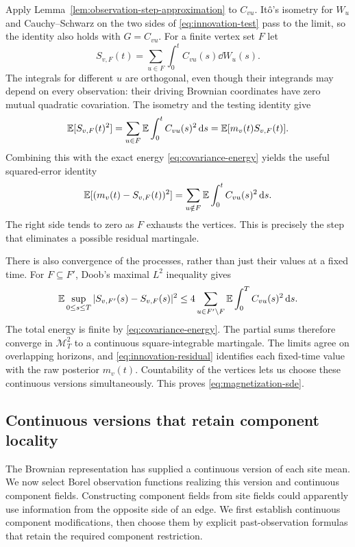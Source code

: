 Apply Lemma~\ref{lem:observation-step-approximation} to $C_{vu}$.
It\^o's isometry for $W_u$ and Cauchy--Schwarz on the two sides of
\eqref{eq:innovation-test} pass to the limit, so the identity also
holds with $G=C_{vu}$.  For a finite vertex set $F$ let
\[
 S_{v,F}(t)=\sum_{u\in F}\int_0^tC_{vu}(s)\dd W_u(s).
\]
The integrals for different $u$ are orthogonal, even though their
integrands may depend on every observation: their driving Brownian
coordinates have zero mutual quadratic covariation.  The isometry and
the testing identity give
\[
 \mathbb E[S_{v,F}(t)^2]
   =\sum_{u\in F}\mathbb E\int_0^t C_{vu}(s)^2\,\mathrm d s
   =\mathbb E[m_v(t)S_{v,F}(t)] .
\]
Combining this with the exact energy
\eqref{eq:covariance-energy} yields the useful squared-error identity
\begin{equation}
 \label{eq:innovation-residual}
 \mathbb E[(m_v(t)-S_{v,F}(t))^2]
     =\sum_{u\notin F}\mathbb E\int_0^t C_{vu}(s)^2\,\mathrm d s.
\end{equation}
The right side tends to zero as $F$ exhausts the vertices.  This is
precisely the step that eliminates a possible residual martingale.

There is also convergence of the processes, rather than just their
values at a fixed time.  For $F\subseteq F'$, Doob's maximal
$L^2$ inequality gives
\[
 \mathbb E\sup_{0\le s\le T}|S_{v,F'}(s)-S_{v,F}(s)|^2
 \le4\sum_{u\in F'\setminus F}
                    \mathbb E\int_0^T C_{vu}(s)^2\,\mathrm d s .
\]
The total energy is finite by \eqref{eq:covariance-energy}.  The
partial sums therefore converge in $\mathcal M_T^2$ to a continuous
square-integrable martingale.  The limits agree on overlapping
horizons, and \eqref{eq:innovation-residual} identifies each
fixed-time value with the raw posterior $m_v(t)$.  Countability of
the vertices lets us choose these continuous versions simultaneously.
This proves \eqref{eq:magnetization-sde}.

\subsection{Continuous versions that retain component locality}
 \label{sec:continuous-causal-versions}

The Brownian representation has supplied a continuous version of each
site mean.  We now select Borel observation functions realizing this
version and continuous component fields.  Constructing component
fields from site fields could apparently use information from the
opposite side of an edge.  We first establish continuous component
modifications, then choose them by explicit past-observation formulas
that retain the required component restriction.

